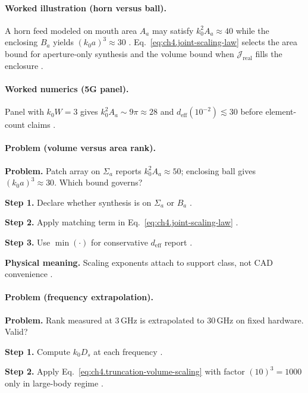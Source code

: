 \paragraph{Worked illustration (horn versus ball).}
A horn feed modeled on mouth area \(A_{a}\) may satisfy \(k_{0}^{2}A_{a}\approx40\) while the enclosing \(B_{a}\) yields
\((k_{0}a)^{3}\approx30\) \cite{collin2001,harrington2001}. Eq.~\eqref{eq:ch4.joint-scaling-law} selects the area bound for aperture-only
synthesis and the volume bound when \(\mathcal{J}_{\mathrm{real}}\) fills the enclosure \cite{stratton1941,devaney2004}.

\paragraph{Worked numerics (5G panel).}
Panel with \(k_{0}W=3\) gives \(k_{0}^{2}A_{a}\sim9\pi\approx28\) and \(d_{\mathrm{eff}}(10^{-2})\lesssim30\) before element-count claims
\cite{hansen1988,collin2001,harrington2001}.

\paragraph{Problem (volume versus area rank).}
\textbf{Problem.} Patch array on \(\Sigma_{a}\) reports \(k_{0}^{2}A_{a}\approx50\); enclosing ball gives \((k_{0}a)^{3}\approx30\). Which
bound governs?

\textbf{Step 1.} Declare whether synthesis is on \(\Sigma_{a}\) or \(B_{a}\) \cite{collin2001,stratton1941}.

\textbf{Step 2.} Apply matching term in Eq.~\eqref{eq:ch4.joint-scaling-law} \cite{harrington2001,devaney2004}.

\textbf{Step 3.} Use \(\min(\cdot)\) for conservative \(d_{\mathrm{eff}}\) report \cite{hansen1988}.

\textbf{Physical meaning.} Scaling exponents attach to support class, not CAD convenience \cite{stratton1941}.

\paragraph{Problem (frequency extrapolation).}
\textbf{Problem.} Rank measured at \(3\,\mathrm{GHz}\) is extrapolated to \(30\,\mathrm{GHz}\) on fixed hardware. Valid?

\textbf{Step 1.} Compute \(k_{0}D_{s}\) at each frequency \cite{jackson1999}.

\textbf{Step 2.} Apply Eq.~\eqref{eq:ch4.truncation-volume-scaling} with factor \((10)^{3}=1000\) only in large-body regime \cite{hansen1988,harrington2001}.


